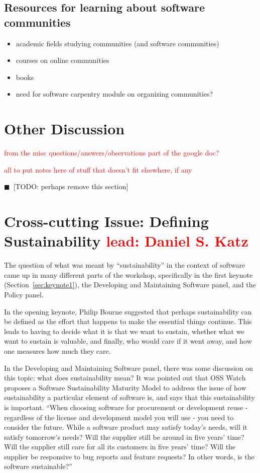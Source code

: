 \documentclass[11pt, oneside]{amsart}
\newcommand{\todo}[1]{{\color{blue}$\blacksquare$~\textsf{[TODO: #1]}}}
\newcommand{\note}[1]{ {\textcolor{red}    { #1 }}}
\begin{document}
\subsection{Resources for learning about software communities}
\begin{itemize}
\item academic fields studying communities (and software communities)
\item courses on online communities
\item books
\item need for software carpentry module on organizing communities?
\end{itemize}

\section{Other Discussion} \label{sec:other}

\note{from the misc questions/answers/observations part of the google doc?}

\note{all to put notes here of stuff that doesn't fit elsewhere, if any}

\todo{perhaps remove this section}


\section{Cross-cutting Issue: Defining Sustainability \scriptsize{\note{lead: Daniel S. Katz}}}  \label{sec:cross-cutting}

The question of what was meant by ``sustainability'' in the context of software
came up in many different parts of the workshop, specifically in the first
keynote (Section~\ref{sec:keynote1}), the Developing and Maintaining Software panel, and the Policy panel.

In the opening keynote, Philip Bourne suggested that perhaps sustainability can be defined
as the effort that happens to make the essential things continue. This leads to
having to decide what it is that we want to sustain, whether what we want to sustain is
valuable, and finally, who would care if it went away, and how one measures
how much they care.

In the Developing and Maintaining Software panel, there was some discussion
on this topic: what does sustainability mean? It was pointed out that
OSS Watch proposes a Software Sustainability Maturity Model to address
the issue of how sustainability a particular element of software is, and says
that this sustainability is important. ``When choosing
software for procurement or development reuse - regardless of the
license and development model you will use - you need to consider
the future. While a software product may satisfy today's needs, will
it satisfy tomorrow's needs? Will the supplier still be around in
five years' time? Will the supplier still care for all its customers
in five years' time? Will the supplier be responsive to bug reports
and feature requests? In other words, is the software sustainable?''~\cite{OSS-ssmm-web}
\end{document}
